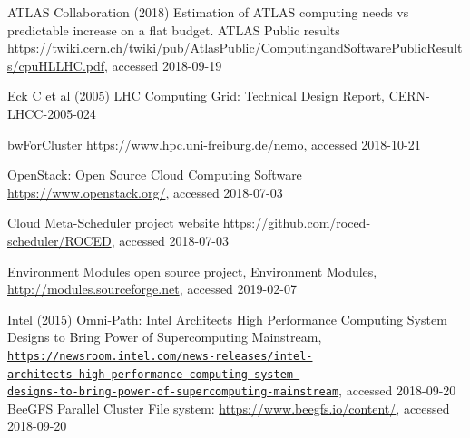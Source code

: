 
\begin{thebibliography}{}
%
%
  ATLAS Collaboration (2018) Estimation of ATLAS computing needs vs
  predictable increase on a flat budget. ATLAS Public results
  \url{https://twiki.cern.ch/twiki/pub/AtlasPublic/ComputingandSoftwarePublicResults/cpuHLLHC.pdf},
  accessed 2018-09-19

	Eck C et al
  (2005) LHC Computing Grid: Technical Design Report, 
  CERN-LHCC-2005-024


 bwForCluster \NEMO \url{https://www.hpc.uni-freiburg.de/nemo}, accessed 2018-10-21
  
OpenStack: Open Source Cloud Computing Software
\url{https://www.openstack.org/}, accessed 2018-07-03

\Roced Cloud Meta-Scheduler project website
\url{https://github.com/roced-scheduler/ROCED}, accessed 2018-07-03

Environment Modules open source project,
Environment Modules,
\url{http://modules.sourceforge.net}, accessed 2019-02-07

 Intel (2015) Omni-Path:
Intel Architects High Performance Computing System Designs to Bring
Power of Supercomputing Mainstream,
\texttt{\href{https://newsroom.intel.com/news-releases/intel-architects-high-performance-computing-system-designs-to-bring-power-of-supercomputing-mainstream/}{https://newsroom.intel.com/news-releases/intel-\\architects-high-performance-computing-system-\\designs-to-bring-power-of-supercomputing-mainstream}}, accessed 2018-09-20
BeeGFS Parallel Cluster File system:
\url{https://www.beegfs.io/content/}, accessed 2018-09-20


\end{thebibliography}
